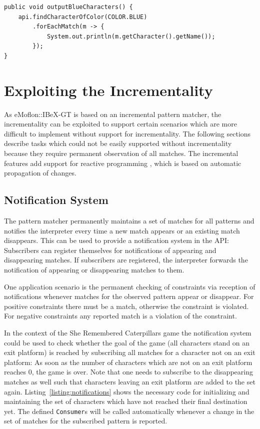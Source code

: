 \begin{lstlisting}[caption={Parameters}, label={listing:parameters}]
public void outputBlueCharacters() {
	api.findCharacterOfColor(COLOR.BLUE)
		.forEachMatch(m -> {
			System.out.println(m.getCharacter().getName());
		});
}
\end{lstlisting}

\section{Exploiting the Incrementality}
\label{incrementality}
As eMoflon::IBeX-GT is based on an incremental pattern matcher, the incrementality can be exploited to support certain scenarios which are more difficult to implement without support for incrementality.
The following sections describe tasks which could not be easily supported without incrementality because they require permanent observation of all matches.
The incremental features add support for reactive programming \cite{SurveyReactiveProgramming}, which is based on automatic propagation of changes.

\subsection{Notification System}
\label{notification-system}
The pattern matcher permanently maintains a set of matches for all patterns and notifies the interpreter every time a new match appears or an existing match disappears.
This can be used to provide a notification system in the API: Subscribers can register themselves for notifications of appearing and disappearing matches.
If subscribers are registered, the interpreter forwards the notification of appearing or disappearing matches to them.

One application scenario is the permanent checking of constraints via reception of notifications whenever matches for the observed pattern appear or disappear.
For positive constraints there must be a match, otherwise the constraint is violated.
For negative constraints any reported match is a violation of the constraint.

In the context of the She Remembered Caterpillars game the notification system could be used to check whether the goal of the game (all characters stand on an exit platform) is reached by subscribing all matches for a character not on an exit platform:
As soon as the number of characters which are not on an exit platform reaches 0, the game is over.
Note that one needs to subscribe to the disappearing matches as well such that characters leaving an exit platform are added to the set again.
Listing~\ref{listing:notifications} shows the necessary code for initializing and maintaining the set of characters which have not reached their final destination yet.
The defined \texttt{Consumer}s will be called automatically whenever a change in the set of matches for the subscribed pattern is reported.

